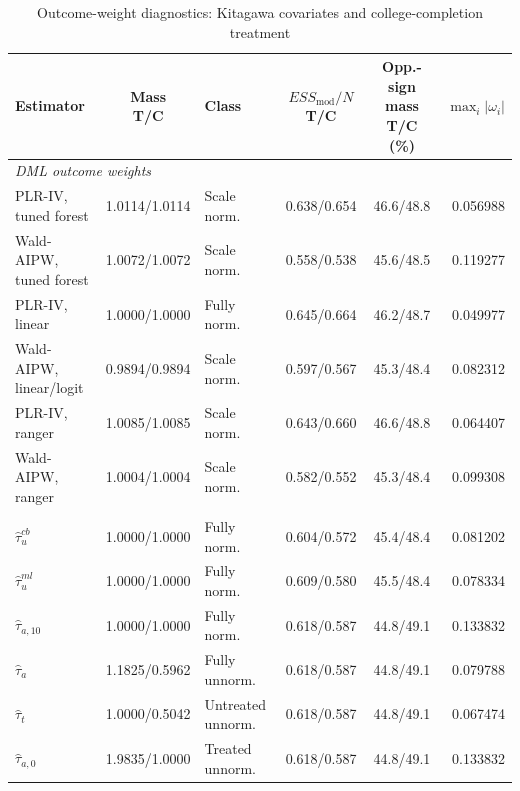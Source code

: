 \documentclass[12pt, a4paper, oneside]{article}
\theoremstyle{plain}
\theoremstyle{definition}
\begin{document}
\begin{table}[H]
    \centering
    \caption{Outcome-weight diagnostics: Kitagawa covariates and college-completion treatment}
    \label{tab:card_weights_kit_educ16}
    \scriptsize
    \setlength{\tabcolsep}{3pt}
    \renewcommand{\arraystretch}{0.93}
    \begin{tabular}{@{}lclccr@{}}
        \toprule
        Estimator &
        \shortstack{Mass\\T/C} &
        Class &
        \shortstack{$ESS_{\mathrm{mod}}/N$\\T/C} &
        \shortstack{Opp.-sign mass\\T/C (\%)} &
        $\max_i|\omega_i|$ \\
        \midrule
        \multicolumn{6}{l}{\textit{DML outcome weights}} \\
        PLR-IV, tuned forest
            & 1.0114/1.0114 & Scale norm.
            & 0.638/0.654 & 46.6/48.8 & 0.056988 \\
        Wald-AIPW, tuned forest
            & 1.0072/1.0072 & Scale norm.
            & 0.558/0.538 & 45.6/48.5 & 0.119277 \\
        PLR-IV, linear
            & 1.0000/1.0000 & Fully norm.
            & 0.645/0.664 & 46.2/48.7 & 0.049977 \\
        Wald-AIPW, linear/logit
            & 0.9894/0.9894 & Scale norm.
            & 0.597/0.567 & 45.3/48.4 & 0.082312 \\
        PLR-IV, ranger
            & 1.0085/1.0085 & Scale norm.
            & 0.643/0.660 & 46.6/48.8 & 0.064407 \\
        Wald-AIPW, ranger
            & 1.0004/1.0004 & Scale norm.
            & 0.582/0.552 & 45.3/48.4 & 0.099308 \\
        \addlinespace
        \multicolumn{6}{l}{\textit{Kappa outcome weights}} \\
        $\widehat{\tau}^{cb}_{u}$
            & 1.0000/1.0000 & Fully norm.
            & 0.604/0.572 & 45.4/48.4 & 0.081202 \\
        $\widehat{\tau}^{ml}_{u}$
            & 1.0000/1.0000 & Fully norm.
            & 0.609/0.580 & 45.5/48.4 & 0.078334 \\
        $\widehat{\tau}_{a,10}$
            & 1.0000/1.0000 & Fully norm.
            & 0.618/0.587 & 44.8/49.1 & 0.133832 \\
        $\widehat{\tau}_{a}$
            & 1.1825/0.5962 & Fully unnorm.
            & 0.618/0.587 & 44.8/49.1 & 0.079788 \\
        $\widehat{\tau}_{t}$
            & 1.0000/0.5042 & Untreated unnorm.
            & 0.618/0.587 & 44.8/49.1 & 0.067474 \\
        $\widehat{\tau}_{a,0}$
            & 1.9835/1.0000 & Treated unnorm.
            & 0.618/0.587 & 44.8/49.1 & 0.133832 \\
        \bottomrule
    \end{tabular}
\end{table}
\end{document}
